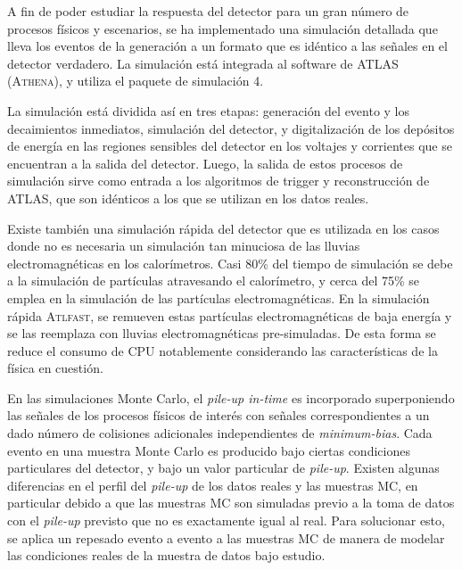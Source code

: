 A fin de poder estudiar la respuesta del detector para un gran número de procesos
físicos y escenarios, se ha implementado una simulación detallada que lleva los
eventos de la generación a un formato que es idéntico a las señales en el
detector verdadero\cite{AtlasSim}. La simulación está integrada al software de
ATLAS (\textsc{Athena}), y utiliza el paquete de simulación
{\geant}4\cite{Geant4}.

La simulación está dividida así en tres etapas: generación del evento y los
decaimientos inmediatos, simulación del detector, y digitalización de
los depósitos de energía en las regiones sensibles del detector en los voltajes
y corrientes que se encuentran a la salida del detector. Luego, la salida de
estos procesos de simulación sirve como entrada a los algoritmos de
trigger y reconstrucción de ATLAS, que son idénticos a los que se utilizan en
los datos reales.

Existe también una simulación rápida del detector que es utilizada en los casos
donde no es necesaria un simulación tan minuciosa de las lluvias
electromagnéticas en los calorímetros. Casi 80\% del tiempo de simulación se
debe a la simulación de partículas atravesando el calorímetro, y cerca del 75\%
se emplea en la simulación de las partículas electromagnéticas. En la simulación
rápida \textsc{Atlfast}\cite{Richter-Was:683751}, se remueven estas partículas
electromagnéticas de baja energía y se las reemplaza con lluvias
electromagnéticas pre-simuladas. De esta forma se reduce el consumo de CPU
notablemente considerando las características de la física en cuestión.

En las simulaciones Monte Carlo, el \emph{pile-up in-time} es incorporado
superponiendo las señales de los procesos físicos de interés con señales
correspondientes a un dado número de colisiones adicionales independientes de
\emph{minimum-bias}.
Cada evento en una muestra Monte Carlo es producido bajo ciertas condiciones
particulares del detector, y bajo un valor particular de \emph{pile-up}. Existen
algunas diferencias en el perfil del \emph{pile-up} de los datos reales y las muestras
MC, en particular debido a que las muestras MC son simuladas previo a la toma de
datos con el \emph{pile-up} previsto que no es exactamente igual al real. Para
solucionar esto, se aplica un repesado evento a evento a las muestras MC de
manera de modelar las condiciones reales de la muestra de datos bajo estudio.
